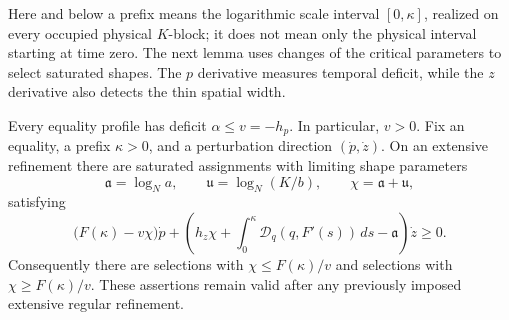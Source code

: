 Here and below a prefix means the logarithmic scale interval
$[0,\kappa]$, realized on every occupied physical $K$-block; it does not
mean only the physical interval starting at time zero. The next lemma
uses changes of the critical parameters to select saturated shapes. The
$p$ derivative measures temporal deficit, while the $z$ derivative also
detects the thin spatial width.

\begin{lemma}
\label{lem:derivative-capture}
Every equality profile has deficit $\alpha\le v=-h_p$. In particular,
$v>0$. Fix an equality, a prefix $\kappa>0$, and a perturbation direction
$(\dot p,\dot z)$. On an extensive refinement there are saturated
assignments with limiting shape parameters
\[
 \mathfrak a=\log_N a,\qquad
 \mathfrak u=\log_N(K/b),\qquad
 \chi=\mathfrak a+\mathfrak u,
\]
satisfying
\begin{equation}
 \bigl(F(\kappa)-v\chi\bigr)\dot p
 +\left(h_z\chi+
   \int_0^\kappa\mathcal D_q(q,F'(s))\,ds
   -\mathfrak a\right)\dot z\ge0.
 \label{eq:derivative-capture}
\end{equation}
Consequently there are selections with $\chi\le F(\kappa)/v$ and
selections with $\chi\ge F(\kappa)/v$. These assertions remain valid
after any previously imposed extensive regular refinement.
\end{lemma}

